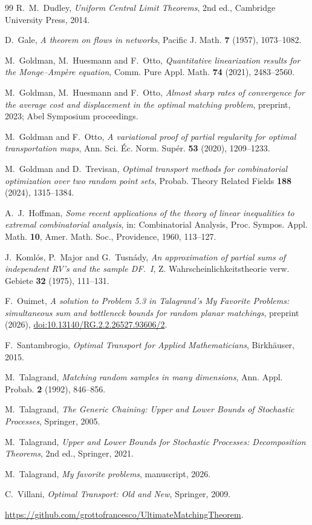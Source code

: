 \documentclass[11pt]{article}
\theoremstyle{definition}
\theoremstyle{remark}
\numberwithin{equation}{section}
\begin{document}
\begin{thebibliography}{99}
R.~M.~Dudley, \emph{Uniform Central Limit Theorems}, 2nd ed.,
Cambridge University Press, 2014.

D.~Gale, \emph{A theorem on flows in networks},
Pacific J. Math. \textbf{7} (1957), 1073--1082.

M.~Goldman, M.~Huesmann and F.~Otto,
\emph{Quantitative linearization results for the Monge--Amp\`ere equation},
Comm. Pure Appl. Math. \textbf{74} (2021), 2483--2560.

M.~Goldman, M.~Huesmann and F.~Otto,
\emph{Almost sharp rates of convergence for the average cost and
displacement in the optimal matching problem}, preprint, 2023;
Abel Symposium proceedings.

M.~Goldman and F.~Otto,
\emph{A variational proof of partial regularity for optimal
transportation maps}, Ann. Sci. \'Ec. Norm. Sup\'er. \textbf{53} (2020),
1209--1233.

M.~Goldman and D.~Trevisan,
\emph{Optimal transport methods for combinatorial optimization over two
random point sets}, Probab. Theory Related Fields \textbf{188} (2024),
1315--1384.

A.~J.~Hoffman, \emph{Some recent applications of the theory of linear
inequalities to extremal combinatorial analysis},
in: Combinatorial Analysis, Proc. Sympos. Appl. Math. \textbf{10},
Amer. Math. Soc., Providence, 1960, 113--127.

J.~Koml\'os, P.~Major and G.~Tusn\'ady,
\emph{An approximation of partial sums of independent RV's and the
sample DF.~I}, Z. Wahrscheinlichkeitstheorie verw. Gebiete \textbf{32}
(1975), 111--131.

F.~Ouimet,
\emph{A solution to Problem 5.3 in Talagrand's My Favorite Problems:
simultaneous sum and bottleneck bounds for random planar matchings},
preprint (2026),
\href{https://doi.org/10.13140/RG.2.2.26527.93606/2}{doi:10.13140/RG.2.2.26527.93606/2}.

F.~Santambrogio, \emph{Optimal Transport for Applied Mathematicians},
Birkh\"auser, 2015.

M.~Talagrand,
\emph{Matching random samples in many dimensions},
Ann. Appl. Probab. \textbf{2} (1992), 846--856.

M.~Talagrand,
\emph{The Generic Chaining: Upper and Lower Bounds of Stochastic
Processes}, Springer, 2005.

M.~Talagrand,
\emph{Upper and Lower Bounds for Stochastic Processes: Decomposition
Theorems}, 2nd ed., Springer, 2021.

M.~Talagrand, \emph{My favorite problems}, manuscript, 2026.

C.~Villani, \emph{Optimal Transport: Old and New}, Springer, 2009.

\url{https://github.com/grottofrancesco/UltimateMatchingTheorem}.

\end{thebibliography}
\end{document}
